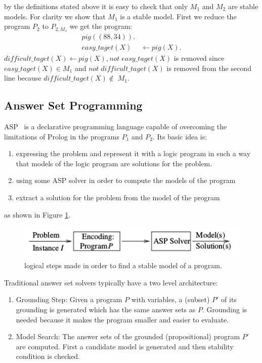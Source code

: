 by the definitions stated above it is easy to check that only \(M_1\) and \(M_2\) are stable models. For clarity we show that \(M_1\) is a stable model. First we reduce the program \(P_2\) to \(P_{2,M_1}\) we get the program:
\begin{align}
pig((88,34)).& \\
easy\_taget(X) &\leftarrow pig(X). 
\end{align}
\(difficult\_taget(X) \leftarrow pig(X), not\; easy\_taget(X) \) is removed since \(easy\_taget(X) \in M_1\) and \(not\; difficult\_taget(X)\) is removed from the second line because \(difficult\_taget(X) \notin\; M_1\).
\subsection{Answer Set Programming}

ASP~\cite{aspPrime} is a declarative programming language capable of overcoming the limitations of Prolog in the programs \(P_1\) and \(P_2\). Its basic idea is:
\begin{enumerate}
\item expressing the problem and represent it with a logic program in such a way that models of the logic program are solutions for the problem.
\item using some ASP solver in order to compute the models of the program
\item extract a solution for the problem from the model of the program
\end{enumerate}
as shown in Figure \ref{fig:ASP1}.
\begin{figure}
  \includegraphics[width=\linewidth]{f1.png}
  \caption{logical steps made in order to find a stable model of a program.}
  \label{fig:ASP1}
\end{figure}
 
Traditional answer set solvers typically have a two level architecture:
\begin{enumerate}
\item Grounding Step: Given a program \(P\) with variables, a (subset) \(P'\) of its grounding is generated which has the same answer sets as \(P\). Grounding is needed because it makes the program smaller and easier to evaluate.
\item Model Search: The answer sets of the grounded (propositional) program \(P'\) are computed. First a candidate model is generated and then stability condition is checked.
\end{enumerate}

